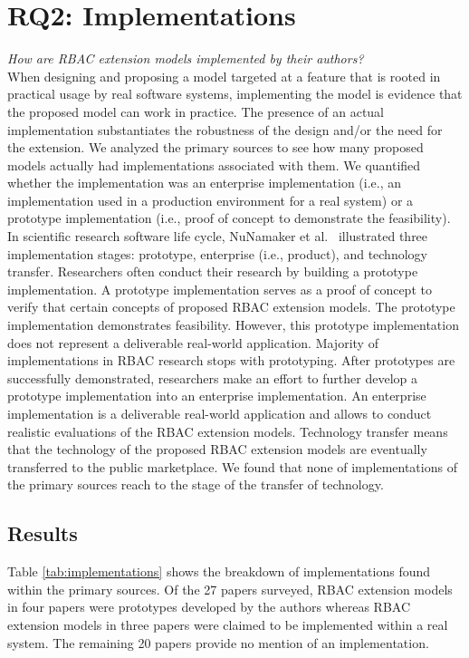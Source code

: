 \section{RQ2: Implementations} \label{sec:implementations}

\textit{How are RBAC extension models implemented by their authors?}
\\

When designing and proposing a model targeted at a feature that is rooted in practical
usage by real software systems, implementing the model is evidence that the
proposed model can work in practice. The presence of an actual implementation substantiates the robustness of the design and/or the need for the extension.
We analyzed the primary sources to see how many
proposed models actually had implementations associated with them.
We quantified whether the implementation was an enterprise implementation (i.e., an implementation used in a production environment for a real system) or a prototype implementation (i.e., proof of concept to demonstrate the feasibility). In scientific research software life cycle, NuNamaker et al.~\cite{nunamaker1990systems} illustrated three implementation stages: prototype, enterprise (i.e., product), and technology transfer. Researchers often conduct their research by building a prototype implementation. A prototype implementation serves as a proof of concept to verify that certain concepts of proposed RBAC extension models. The prototype implementation demonstrates feasibility. However, this prototype implementation does not represent a deliverable real-world application. Majority of implementations in RBAC research stops with prototyping. After prototypes are successfully demonstrated, researchers make an effort to further develop a prototype implementation into an enterprise implementation. An enterprise implementation is a deliverable real-world application and allows to conduct realistic evaluations of the RBAC extension models. Technology transfer means that the technology of the proposed RBAC extension models are eventually transferred to the public marketplace. We found that none of implementations of the primary sources reach to the stage of the transfer of technology.


\subsection{Results}

Table \ref{tab:implementations} shows the breakdown of implementations found within the primary sources.
Of the 27 papers surveyed, RBAC extension models in four papers were prototypes developed by the authors whereas RBAC extension models in three papers were claimed to be implemented within a real
system. The remaining 20 papers provide no
mention of an implementation.  

